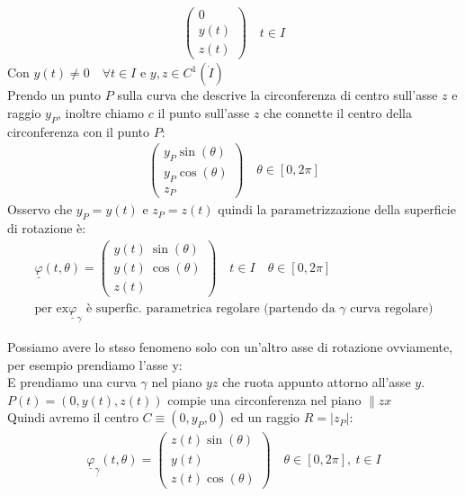 \documentclass[a4paper, oneside]{article}
\begin{document}
\begin{definition}
\begin{gather*}
\begin{pmatrix}
        0\\
        y(t)\\
        z(t)
      \end{pmatrix} \quad t \in I
    \end{gather*}
    Con $y(t) \neq 0 \quad \forall t \in I$ e $y,z \in C^1(\mathring{I})$\\
    Prendo un punto $P$ sulla curva che descrive la circonferenza di centro sull'asse $z$ e raggio $y_P$, inoltre chiamo $c$ il punto sull'asse $z$ che connette il centro della circonferenza con il punto $P$:
    \begin{gather*}
      \begin{pmatrix}
        y_P \sin(\theta)\\
        y_P \cos(\theta)\\
        z_P
      \end{pmatrix} \quad \theta \in [0,2\pi]
    \end{gather*}
    Osservo che $y_P = y(t)$ e $z_P = z(t)$ quindi la parametrizzazione della superficie di rotazione è:
    \begin{gather*}
      \underline{\varphi}(t,\theta) = \begin{pmatrix}
        y(t) \ \sin(\theta)\\
        y(t) \ \cos(\theta)\\
        z(t)
      \end{pmatrix} \quad t \in I \quad \theta \in [0,2\pi]\\
      \text{per ex} \underline{\varphi}_\gamma \text{ è superfic. parametrica regolare (partendo da $\gamma$ curva regolare)}
    \end{gather*}
\end{definition}


\begin{aside}
  Possiamo avere lo stsso fenomeno solo con un'altro asse di rotazione ovviamente, per esempio prendiamo l'asse y:\\
  E prendiamo una curva $\gamma$ nel piano $yz$ che ruota appunto attorno all'asse $y$.\\
  $P(t) = (0,y(t), z(t))$ compie una circonferenza nel piano $\parallel zx$\\
  Quindi avremo il centro $C \equiv (0, y_P, 0)$ ed un raggio $R = |z_P|$:
  \begin{gather*}
    \underline{\varphi}_{\underline{\gamma}} (t, \theta) = \begin{pmatrix}
      z(t) \sin(\theta)\\
      y(t)\\
      z(t) \cos(\theta)
    \end{pmatrix} \quad \theta \in [0,2\pi], \ t \in I
  \end{gather*}
\end{aside}
\end{document}

